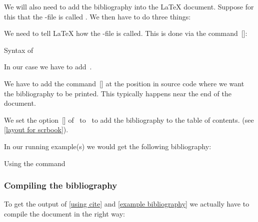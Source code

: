We will also need to add the bibliography into the {\LaTeX} document.
Suppose for this that the -file is called .
We then have to do three things:
\begin{myitemize}
  \item
    We need to tell {\LaTeX} how the -file is called.
    This is done via the command~[\comname]:
    \begin{showcode}{Syntax of }

    \end{showcode}
    In our case we have to add~.
  \item
    We have to add the command~[\comname] at the position in source code where we want the bibliography to be printed.
    This typically happens near the end of the document.
  \item
    We set the option~[\optname] of~ to~ to add the bibliography to the table of contents. (see \cref{layout for scrbook}).
\end{myitemize}

In our running example(s) we would get the following bibliography:
\let\oldprintbibliography\printbibliography
\renewcommand{\printbibliography}{%
  \oldprintbibliography[
    heading   = subbibliography,
    title     = {Bibliography},
    category  = testentries
  ]
}
\begin{showlatex}[label = {example bibliography}]
  {Using the command~}
\printbibliography
\end{showlatex}
\let\printbibliography\oldprintbibliography



\subsubsection{Compiling the bibliography}

To get the output of \cref{using cite} and \cref{example bibliography} we actually have to compile the document in the right way:

